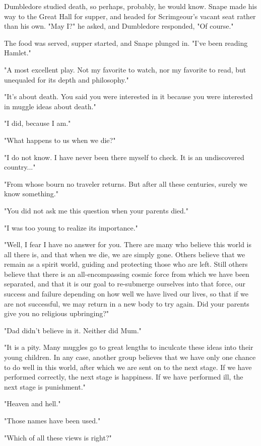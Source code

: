 Dumbledore studied death, so perhaps, probably, he would know. Snape made his way to the Great Hall for supper, and headed for Scrimgeour's vacant seat rather than his own. "May I?" he asked, and Dumbledore responded, "Of course."

The food was served, supper started, and Snape plunged in. "I've been reading Hamlet."

"A most excellent play. Not my favorite to watch, nor my favorite to read, but unequaled for its depth and philosophy."

"It's about death. You said you were interested in it because you were interested in muggle ideas about death."

"I did, because I am."

"What happens to us when we die?"

"I do not know. I have never been there myself to check. It is an undiscovered country..."

"From whose bourn no traveler returns. But after all these centuries, surely we know something."

"You did not ask me this question when your parents died."

"I was too young to realize its importance."

"Well, I fear I have no answer for you. There are many who believe this world is all there is, and that when we die, we are simply gone. Others believe that we remain as a spirit world, guiding and protecting those who are left. Still others believe that there is an all-encompassing cosmic force from which we have been separated, and that it is our goal to re-submerge ourselves into that force, our success and failure depending on how well we have lived our lives, so that if we are not successful, we may return in a new body to try again. Did your parents give you no religious upbringing?"

"Dad didn't believe in it. Neither did Mum."

"It is a pity. Many muggles go to great lengths to inculcate these ideas into their young children. In any case, another group believes that we have only one chance to do well in this world, after which we are sent on to the next stage. If we have performed correctly, the next stage is happiness. If we have performed ill, the next stage is punishment."

"Heaven and hell."

"Those names have been used."

"Which of all these views is right?"

